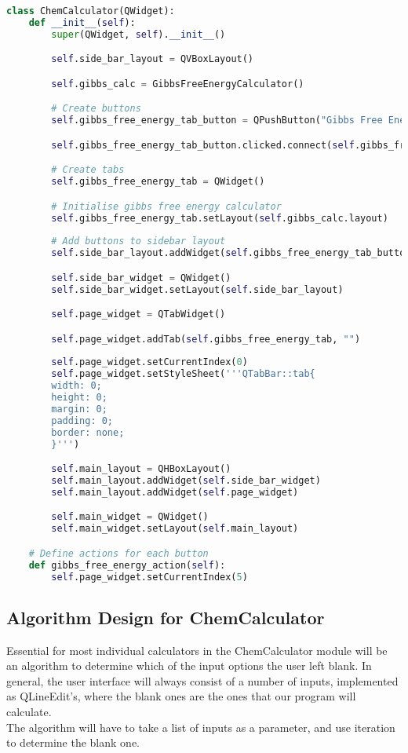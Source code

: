 \documentclass[a4paper,12pt]{article}
\begin{document}
\begin{lstlisting}[language=Python, caption=Example of ChemCalculator implementation]
class ChemCalculator(QWidget):
    def __init__(self):
        super(QWidget, self).__init__()

        self.side_bar_layout = QVBoxLayout()

        self.gibbs_calc = GibbsFreeEnergyCalculator()

        # Create buttons
        self.gibbs_free_energy_tab_button = QPushButton("Gibbs Free Energy Calculator")

        self.gibbs_free_energy_tab_button.clicked.connect(self.gibbs_free_energy_action)

        # Create tabs
        self.gibbs_free_energy_tab = QWidget()

        # Initialise gibbs free energy calculator
        self.gibbs_free_energy_tab.setLayout(self.gibbs_calc.layout)
        
        # Add buttons to sidebar layout
        self.side_bar_layout.addWidget(self.gibbs_free_energy_tab_button)

        self.side_bar_widget = QWidget()
        self.side_bar_widget.setLayout(self.side_bar_layout)

        self.page_widget = QTabWidget()

        self.page_widget.addTab(self.gibbs_free_energy_tab, "")
        
        self.page_widget.setCurrentIndex(0)
        self.page_widget.setStyleSheet('''QTabBar::tab{
        width: 0; 
        height: 0; 
        margin: 0; 
        padding: 0; 
        border: none;
        }''')

        self.main_layout = QHBoxLayout()
        self.main_layout.addWidget(self.side_bar_widget)
        self.main_layout.addWidget(self.page_widget)

        self.main_widget = QWidget()
        self.main_widget.setLayout(self.main_layout)

    # Define actions for each button
    def gibbs_free_energy_action(self):
        self.page_widget.setCurrentIndex(5)

\end{lstlisting}

\subsection{Algorithm Design for ChemCalculator}

Essential for most individual calculators in the ChemCalculator module will be an algorithm to determine which of the input options the user left blank. In general, the user interface will always consist of a number of inputs, implemented as QLineEdit's, where the blank ones are the ones that our program will calculate.\\
The algorithm will have to take a list of inputs as a parameter, and use iteration to determine the blank one.
\end{document}

